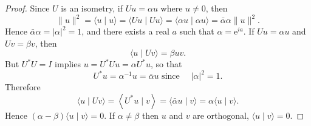 \begin{proof}
Since \(U\) is an isometry, if \(U u=\alpha u\) where \(u \neq 0\), then
\[
\|u\|^{2}=\langle u \mid u\rangle=\langle U u \mid U u\rangle=\langle\alpha u \mid \alpha u\rangle=\bar{\alpha} \alpha\|u\|^{2} .
\]
Hence \(\bar{\alpha} \alpha=|\alpha|^{2}=1\), and there exists a real \(a\) such that \(\alpha=\mathrm{e}^{i a}\).
If \(U u=\alpha u\) and \(U v=\beta v\), then
\[
\langle u \mid U v\rangle=\beta u v .
\]
But \(U^{*} U=I\) implies \(u=U^{*} U u=\alpha U^{*} u\), so that
\[
U^{*} u=\alpha^{-1} u=\bar{\alpha} u \text { since } \quad|\alpha|^{2}=1 .
\]
Therefore
\[
\langle u \mid U v\rangle=\left\langle U^{*} u \mid v\right\rangle=\langle\bar{\alpha} u \mid v\rangle=\alpha\langle u \mid v\rangle .
\]
Hence \((\alpha-\beta)\langle u \mid v\rangle=0\). If \(\alpha \neq \beta\) then \(u\) and \(v\) are orthogonal, \(\langle u \mid v\rangle=0\).
\end{proof}
